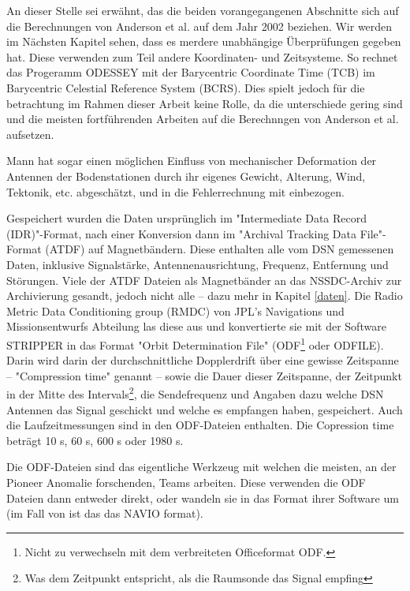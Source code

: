 An dieser Stelle sei erwähnt, das die beiden vorangegangenen Abschnitte sich auf die Berechnungen von Anderson et al. auf dem Jahr 2002 beziehen.
Wir werden im Nächsten Kapitel sehen, dass es merdere unabhängige Überprüfungen gegeben hat.
Diese verwenden zum Teil andere Koordinaten- und Zeitsysteme.
So rechnet das Progeramm ODESSEY mit der Barycentric Coordinate Time (TCB) im Barycentric Celestial Reference System (BCRS).
Dies spielt jedoch für die betrachtung im Rahmen dieser Arbeit keine Rolle, da die unterschiede gering sind und die meisten fortführenden Arbeiten auf die Berechnngen von Anderson et al. aufsetzen.	%

Mann hat sogar einen möglichen Einfluss von mechanischer Deformation der Antennen der Bodenstationen durch ihr eigenes Gewicht,
Alterung, Wind, Tektonik, etc. abgeschätzt, und in die Fehlerrechnung mit einbezogen.\cite{Dittus2006} %


Gespeichert wurden die Daten ursprünglich im "Intermediate Data Record (IDR)"-Format, nach einer Konversion dann im "Archival Tracking Data File"-Format (ATDF) auf Magnetbändern. Diese enthalten alle vom DSN gemessenen Daten, inklusive Signalstärke, Antennenausrichtung, Frequenz, Entfernung und Störungen.\cite{Turyshev2010} %
Viele der ATDF Dateien als Magnetbänder an das NSSDC-Archiv zur Archivierung gesandt, jedoch nicht alle – dazu mehr in Kapitel \ref{daten}.\cite{Markwardt2002}
Die Radio Metric Data Conditioning group (RMDC) von JPL's Navigations und Missionsentwurfs Abteilung las diese aus und konvertierte sie mit der Software STRIPPER in das Format "Orbit Determination File" (ODF\footnote{Nicht zu verwechseln mit dem verbreiteten Officeformat ODF.} oder ODFILE).
Darin wird darin der durchschnittliche Dopplerdrift über eine gewisse Zeitspanne
– "Compression time" genannt – sowie die Dauer dieser Zeitspanne, der Zeitpunkt in der Mitte des Intervals\footnote{Was dem Zeitpunkt entspricht, als die Raumsonde das Signal empfing\cite{Levy2008}}, die Sendefrequenz und
Angaben dazu welche DSN Antennen das Signal geschickt und welche es empfangen haben, gespeichert.\cite{Levy2008}
Auch die Laufzeitmessungen sind in den ODF-Dateien enthalten.\cite{Anderson2002}
Die Copression time beträgt 10 s, 60 s, 600 s oder 1980 s.\cite{Anderson2002} %

Die ODF-Dateien sind das eigentliche Werkzeug mit welchen die meisten, an der Pioneer Anomalie forschenden, Teams arbeiten. Diese verwenden die ODF Dateien dann entweder direkt, oder wandeln sie in das Format ihrer Software um (im Fall von \cite{Anderson2002} ist das das NAVIO format).

